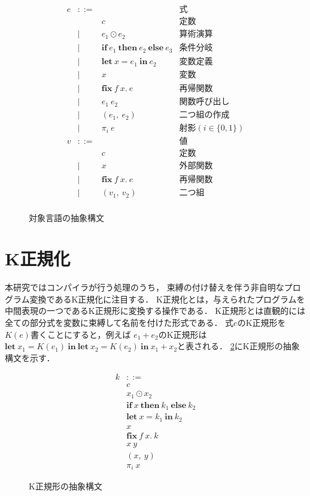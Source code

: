 \documentclass[T]{compsoft}
\newcommand{\keyword}[1]{\mathbf{#1}}
\newcommand{\IF}{\keyword{if}}
\newcommand{\THEN}{\keyword{then}}
\newcommand{\ELSE}{\keyword{else}}
\newcommand{\LET}{\keyword{let}}
\newcommand{\FIX}{\keyword{fix}}
\newcommand{\IN}{\keyword{in}}
\begin{document}
\begin{figure}[tp]
	\[ \begin{array}{lcll}
		e & ::= & & \mbox{式} \\
				& & c	& \mbox{定数} \\
				& | & e_1 \odot e_2 & \mbox{算術演算} \\
				& | & \IF~e_1~\THEN~e_2~\ELSE~e_3 & \mbox{条件分岐} \\
				& | & \LET~x=e_1~\IN~e_2 & \mbox{変数定義} \\
				& | & x & \mbox{変数} \\
				& | & \FIX~f~x.~e & \mbox{再帰関数} \\
				& | & e_1~e_2 & \mbox{関数呼び出し} \\
				& | & (e_1,~e_2) & \mbox{二つ組の作成} \\
				& | & \pi_i~e & \mbox{射影}(i \in \{0, 1\}) \\
			v & ::= & & \mbox{値} \\
				& & c & \mbox{定数} \\
				& | & x & \mbox{外部関数} \\
				& | & \FIX~f~x.~e & \mbox{再帰関数} \\
				& | & (v_1,~v_2) & \mbox{二つ組} \\
	\end{array} \]
	\caption{対象言語の抽象構文}
	\label{eqn:mincaml-ast}
\end{figure}

\section{K正規化}\label{section:knormal}
本研究ではコンパイラが行う処理のうち，
束縛の付け替えを伴う非自明なプログラム変換であるK正規化に注目する．
K正規化とは，与えられたプログラムを中間表現の一つであるK正規形\cite{Birkedal:1996:RIV:237721.237771}に変換する操作である．
K正規形とは直観的には全ての部分式を変数に束縛して名前を付けた形式である．
式$e$のK正規形を$K(e)$書くことにすると，例えば
$e_1+e_2$のK正規形は$\LET~x_1=K(e_1)~\IN~\LET~x_2=K(e_2)~\IN~x_1+x_2$と表される．
\figurename\ref{eqn:mincaml-knormal}にK正規形の抽象構文を示す．

\begin{figure}[tp]
	\[ \begin{array}{ll}
			k & ::= \\
				& c \\
				& x_1 \odot x_2 \\
				& \IF~x~\THEN~k_1~\ELSE~k_2 \\
			 	& \LET~x=k_1~\IN~k_2 \\
				& x \\
				& \FIX~f~x.~k \\
				& x~y \\
				& (x,~y) \\
				& \pi_i~x 
	\end{array} \]
	\caption{K正規形の抽象構文}
	\label{eqn:mincaml-knormal}
\end{figure}
\end{document}

